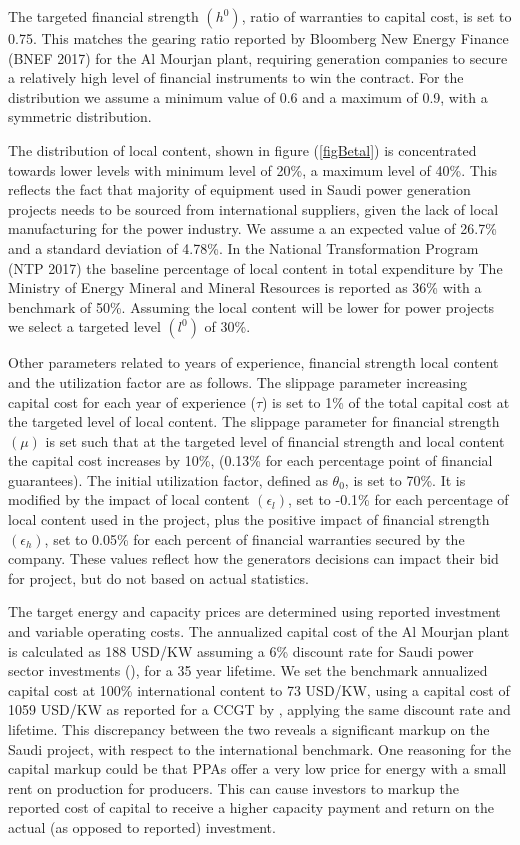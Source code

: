 \documentclass[informs]{informs3}
\begin{document}
The targeted financial strength $(h^{0})$, ratio of warranties to capital cost, is set to 0.75. This matches the gearing ratio reported by Bloomberg New Energy Finance (BNEF 2017) for the Al Mourjan plant, requiring generation companies to secure a relatively high level of financial instruments to win the contract. For the distribution we assume a minimum value of 0.6 and a maximum of 0.9, with a symmetric distribution.

The distribution of local content, shown in figure (\ref{figBetal}) is concentrated towards lower levels with minimum level of 20\%, a maximum level of 40\%. This reflects the fact that majority of equipment used in Saudi power generation projects needs to be sourced from international suppliers, given the lack of local manufacturing for the power industry. We assume a an expected value of 26.7\% and a standard deviation of 4.78\%. In the National Transformation Program (NTP 2017) the baseline percentage of local content in total expenditure by The Ministry of Energy Mineral and Mineral Resources is reported as 36\% with a benchmark of 50\%. Assuming the local content will be lower for power projects we select a targeted level $(l^{0})$ of 30\%. 

Other parameters related to years of experience, financial strength local content and the utilization factor are as follows. The slippage parameter increasing capital cost for each year of experience ($\tau$) is  set to  1\% of the total capital cost at the targeted level of local content. The slippage parameter for financial strength $(\mu)$  is set such that at the targeted level of financial strength and local content the capital cost increases by 10\%, (0.13\% for each percentage point of financial guarantees).  The initial utilization factor, defined as $\theta_0$, is set to 70\%. It is modified by the impact of local content $(\epsilon_l)$, set to -0.1\% for each percentage of local content used in the project,  plus the positive  impact of financial strength $(\epsilon_h)$, set to 0.05\% for each percent of financial warranties secured by the company. These values reflect how the generators decisions can impact their bid for project, but do not based on actual statistics.

The target energy and capacity prices are determined using reported investment and variable operating costs. The annualized capital cost of the Al Mourjan plant is calculated as 188 USD/KW assuming a 6\% discount rate for Saudi power sector investments (\citealp{Matar_et_al_2016}), for a 35 year lifetime. We set the benchmark annualized capital cost at 100\% international content to 73 USD/KW, using a capital cost of 1059 USD/KW as reported for a CCGT by \cite{Rioux_et_al_2017}, applying the same discount rate and lifetime. This discrepancy between the two reveals a significant markup on the Saudi project, with respect to the international benchmark. One reasoning for the capital markup could be that PPAs offer a very low price for energy with a small rent on production for producers. This can cause investors to markup the reported cost of capital to receive a higher capacity payment and return on the actual (as opposed to reported) investment. 
\end{document}
